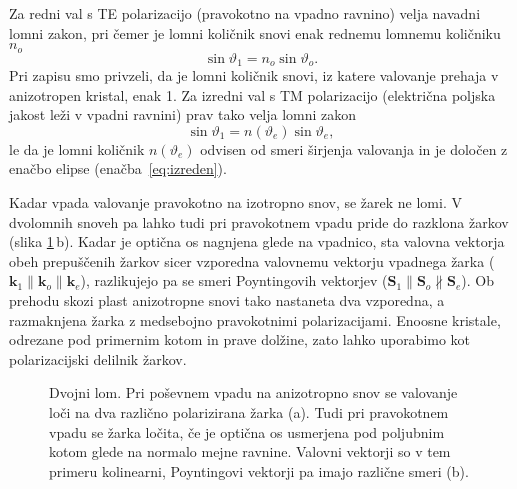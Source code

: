 Za redni val s TE polarizacijo (pravokotno na vpadno ravnino) velja navadni lomni zakon, pri čemer
je lomni količnik snovi enak rednemu lomnemu količniku $n_o$
\begin{equation}
\sin\vartheta_{1}=n_{o}\sin\vartheta_{o}.
\end{equation}
Pri zapisu smo privzeli, da je lomni količnik snovi, iz katere valovanje prehaja v anizotropen 
kristal, enak 1. Za izredni val s TM polarizacijo (električna poljska jakost leži v vpadni ravnini) prav tako 
velja lomni zakon
\begin{equation}
\sin\vartheta_{1}=n(\vartheta_e)\sin\vartheta_{e},
\end{equation}
le da je lomni količnik $n(\vartheta_e)$ odvisen od smeri širjenja valovanja in je določen z enačbo elipse
(enačba~\ref{eq:izreden}).

Kadar vpada valovanje pravokotno na izotropno snov, se žarek ne lomi. V 
dvolomnih snoveh pa lahko tudi pri pravokotnem vpadu pride do razklona žarkov (slika
\ref{fig:dvolomnost}\,b). Kadar je optična os nagnjena glede na vpadnico, sta valovna vektorja
obeh prepuščenih žarkov sicer vzporedna valovnemu vektorju vpadnega žarka ($\mathbf{k}_1 \parallel
\mathbf{k}_o \parallel \mathbf{k}_e$), razlikujejo pa se smeri Poyntingovih vektorjev
($\mathbf{S}_1 \parallel \mathbf{S}_o \nparallel \mathbf{S}_e$). Ob prehodu skozi 
plast anizotropne snovi tako nastaneta dva vzporedna, a razmaknjena žarka z medsebojno
pravokotnimi polarizacijami. Enoosne kristale, odrezane pod primernim kotom in prave dolžine,
zato lahko uporabimo kot polarizacijski delilnik žarkov.

\begin{figure}[h]
\centering
\def\svgwidth{140truemm} 

\caption{Dvojni lom. Pri poševnem vpadu na anizotropno snov se
valovanje loči na dva različno polarizirana žarka (a). Tudi pri pravokotnem vpadu se žarka 
ločita, če je optična os usmerjena pod poljubnim kotom glede na normalo mejne ravnine. Valovni vektorji
so v tem primeru kolinearni, Poyntingovi vektorji pa imajo različne smeri (b).}
\label{fig:dvolomnost}
\end{figure}


